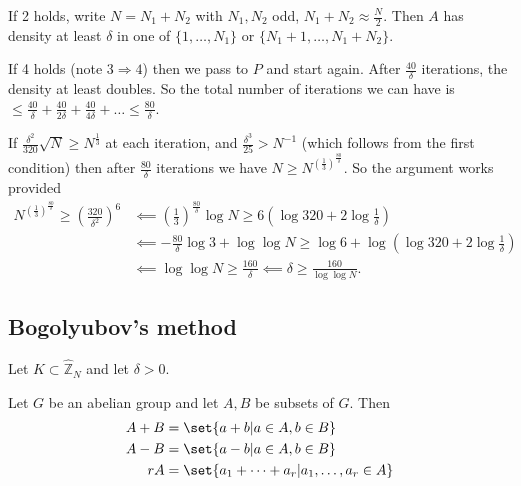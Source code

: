 \documentclass{article}
\newcommand{\1}[1]{\mathbbm{1}_{#1}}
\begin{document}
If 2 holds, write $N = N_1 + N_2$ with $N_1, N_2$ odd, $N_1 + N_2 \approx \frac{N}{2}$.
Then $A$ has density at least $\delta$ in one of $\{1,\dotsc, N_1\}$ or $\{N_1 + 1, \dotsc, N_1 + N_2\}$.

If 4 holds (note $3 \Rightarrow 4$) then we pass to $P$ and start again.
After $\frac{40}{\delta}$ iterations, the density at least doubles.
So the total number of iterations we can have is $\leq \frac{40}{\delta} + \frac{40}{2 \delta} + \frac{40}{4 \delta} + \dotsc \leq \frac{80}{\delta}$.

If $\frac{\delta^2}{320} \sqrt{N} \geq N^\frac{1}{3}$ at each iteration, and $\frac{\delta^3}{25} > N^{-1}$ (which follows from the first condition) then after $\frac{80}{\delta}$ iterations we have $N \geq N^{\left(\frac{1}{3}\right)^\frac{80}{\delta}}$.
So the argument works provided
\begin{align*}
  N^{\left(\frac{1}{3}\right)^\frac{80}{\delta}} \geq \left(\frac{320}{\delta^2}\right)^6 &\impliedby \left(\frac{1}{3}\right)^{\frac{80}{\delta}} \log N \geq 6\left(\log 320 + 2 \log \frac{1}{\delta}\right) \\
                                                                             &\impliedby - \frac{80}{\delta} \log 3 + \log \log N \geq \log 6 + \log \left(\log 320 + 2 \log \frac{1}{\delta}\right) \\
                                                                             &\impliedby \log \log N \geq \frac{160}{\delta} \impliedby \delta \geq \frac{160}{\log \log N}.
\end{align*}

\subsection{Bogolyubov's method}
Let $K \subset \hat{\mathbb{Z}}_N$ and let $\delta > 0$.
\begin{defi}
  Let $G$ be an abelian group and let $A,B$ be subsets of $G$. Then
  \begin{align*}
    A + B &= \set{a + b | a \in A, b \in B} \\
    A - B &= \set{a - b | a \in A, b \in B} \\
    rA &= \set{a_1 + \dotsb + a_r | a_1, \dotsc, a_r \in A}
  \end{align*}
\end{defi}
\end{document}
